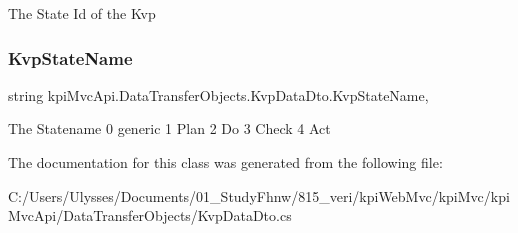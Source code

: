The State Id of the Kvp 

\mbox{\label{classkpi_mvc_api_1_1_data_transfer_objects_1_1_kvp_data_dto_a4d61657eaf038f17856597d2ea5aeeec}} 
\subsubsection{\texorpdfstring{Kvp\+State\+Name}{KvpStateName}}
{\footnotesize\ttfamily string kpi\+Mvc\+Api.\+Data\+Transfer\+Objects.\+Kvp\+Data\+Dto.\+Kvp\+State\+Name\hspace{0.3cm}{\ttfamily [get]}, {\ttfamily [set]}}



The Statename 0 generic 1 Plan 2 Do 3 Check 4 Act 



The documentation for this class was generated from the following file\+:\begin{DoxyCompactItemize}
\item 
C\+:/\+Users/\+Ulysses/\+Documents/01\+\_\+\+Study\+Fhnw/815\+\_\+veri/kpi\+Web\+Mvc/kpi\+Mvc/kpi\+Mvc\+Api/\+Data\+Transfer\+Objects/Kvp\+Data\+Dto.\+cs\end{DoxyCompactItemize}
